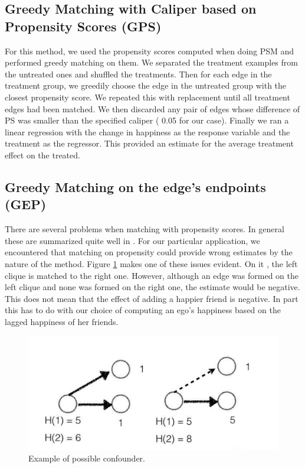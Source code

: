 \documentclass[11pt]{article}
\begin{document}
\subsection{Greedy Matching with Caliper based on Propensity Scores (GPS)}
For this method, we used the propensity scores computed when doing PSM and performed greedy matching on them. We separated the treatment examples from the untreated ones and shuffled the treatments. Then for each edge in the treatment group, we greedily choose the edge in the untreated group with the closest propensity score. We repeated this with replacement until all treatment edges had been matched. We then discarded any pair of edges whose difference of PS was smaller than the specified caliper ( 0.05 for our case). Finally we ran a linear regression with the change in happiness as the response variable and the treatment as the regressor. This provided an estimate for the average treatment effect on the treated.

\subsection{Greedy Matching on the edge's endpoints (GEP)}

There are several problems when matching with propensity scores. In general these are summarized quite well in \cite{king2007politically}. For our particular application, we encountered that matching on propensity could provide wrong estimates by the nature of the method. Figure \ref{fig:treatment} makes one of these issues evident. On it , the left clique is matched to the right one. However, although an edge was formed on the left clique and none was formed on the right one, the estimate would be negative. This does not mean that the effect of adding a happier friend is negative. In part this has to do with our choice of computing an ego’s happiness based on the lagged happiness of her friends.\\

\begin{figure}[h]
\centering
\includegraphics[scale=.3]{graph}
\caption{Example of possible confounder.}
\label{fig:treatment}
\end{figure}
\end{document}
